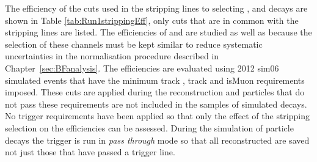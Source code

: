 The efficiency of the cuts used in the stripping lines to selecting \bmumu, \bhh and \bujpsik decays are shown in Table \ref{tab:Run1strippingEff}, only cuts that are in common with the \bmumu stripping lines are listed. The efficiencies of \bhh and \bujpsik are studied as well as \bmumu because the selection of these channels must be kept similar to reduce systematic uncertainties in the normalisation procedure described in Chapter~\ref{sec:BFanalysis}. The efficiencies are evaluated using 2012 sim06 simulated events that have the minimum track \pt, track \chisqd and isMuon requirements imposed. These cuts are applied during the reconstruction and particles that do not pass these requirements are not included in the samples of simulated decays. No trigger requirements have been applied so that only the effect of the stripping selection on the efficiencies can be assessed. During the simulation of particle decays the trigger is run in {\it pass through} mode so that all reconstructed are saved not just those that have passed a trigger line. 


